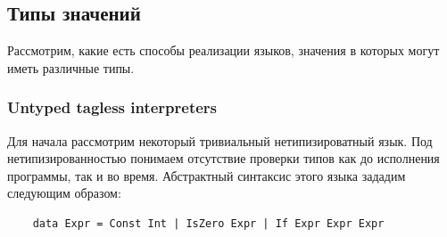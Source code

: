 %
%
%
%

\subsection{Типы значений}

Рассмотрим, какие есть способы реализации языков, значения в которых могут иметь различные типы.

\subsubsection{Untyped tagless interpreters}

Для начала рассмотрим некоторый тривиальный нетипизироватный язык.
Под нетипизированностью понимаем отсутствие проверки типов как до исполнения программы, так и во время.
Абстрактный синтаксис этого языка зададим следующим образом:
\begin{verbatim}
    data Expr = Const Int | IsZero Expr | If Expr Expr Expr
\end{verbatim}


